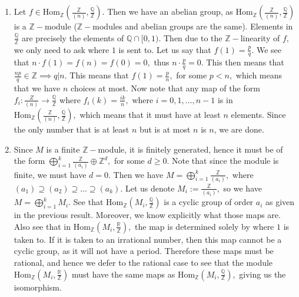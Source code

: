 \documentclass{article}
\begin{document}
\section{} %
\begin{enumerate}
	\item Let $f \in \text{Hom}_{\mathbb{Z}}\left(\frac{\mathbb{Z}}{(n)},\frac{\mathbb{Q}}{\mathbb{Z}}\right).$ Then we have an abelian group, as $ 
	\text{Hom}_{\mathbb{Z}}\left(\frac{\mathbb{Z}}{(n)},\frac{\mathbb{Q}}{\mathbb{Z}}\right)$ is a $\mathbb{Z}-$module ($\mathbb{Z}-$modules and abelian 
	groups are the same).  Elements in $\frac{\mathbb{Q}}{\mathbb{Z}}$ are precisely the elements of $\mathbb{Q} \cap [0,1).$ Then due to the 
	$\mathbb{Z}-$linearity of $f,$ we only need to ask where $1$ is sent to. Let us say that $f(1)=\frac{p}{q}.$ We see that $n \cdot f(1)=f(n)=f(0)=0,$ 
	thus $n \cdot \frac{p}{q}=0.$ This then means that $\frac{np}{q} \in \mathbb{Z} \implies q | n.$ This means that $f(1)=\frac{p}{n},$ for some $p<n,$ 
	which means that we have $n$ choices at most. Now note that any map of the form $f_i:\frac{Z}{(n)}\rightarrow \frac{\mathbb{Q}}{\mathbb{Z}}$ where 
	$f_i(k)=\frac{ik}{n},$ where $i=0,1,\dots,n-1$ is in $\text{Hom}_{\mathbb{Z}}\left(\frac{\mathbb{Z}}{(n)},\frac{\mathbb{Q}}{\mathbb{Z}}\right),$ which 
	means that it must have at least $n$ elements. Since the only number that is at least $n$ but is at most $n$ is $n$, we are done.
	
	\item Since $M$ is a finite $\mathbb{Z}-$module, it is finitely generated, hence it must be of the form $\bigoplus_{i=1}^k \frac{\mathbb{Z}}{(a_i)} 
	\oplus \mathbb{Z}^d,$ for some $d \geq 0.$ Note that since the module is finite, we must have $d=0.$ Then we have $M= \bigoplus_{i=1}^k 
	\frac{\mathbb{Z}}{(a_i)},$ where $(a_1) \supseteq (a_2) \supseteq \dots \supseteq (a_k).$ Let us denote $M_i:= \frac{\mathbb{Z}}{(a_i)},$ so we have 
	$M=\bigoplus_{i=1}^k M_i.$ See that $\text{Hom}_{\mathbb{Z}}\left(M_i,\frac{\mathbb{Q}}{\mathbb{Z}}\right)$ is a cyclic group of order $a_i$ as given in 
	the previous result. Moreover, we know explicitly what those maps are. Also see that in 
	$\text{Hom}_{\mathbb{Z}}\left(M_i,\frac{\mathbb{R}}{\mathbb{Z}}\right),$ the map is determined solely by where $1$ is taken to. If it is taken to an 
	irrational number, then this map cannot be a cyclic group, as it will not have a period. Therefore these maps must be rational, and hence we defer to 
	the rational case to see that the module $\text{Hom}_{\mathbb{Z}}\left(M_i,\frac{\mathbb{R}}{\mathbb{Z}}\right)$ must have the same maps as 
	$\text{Hom}_{\mathbb{Z}}\left(M_i,\frac{\mathbb{Q}}{\mathbb{Z}}\right),$ giving us the isomorphism. 
	

\end{enumerate}
\end{document}
